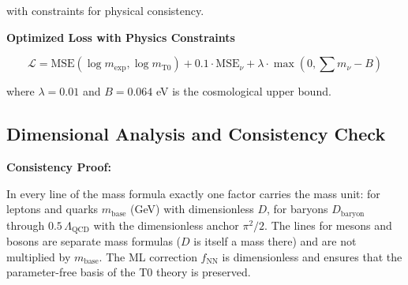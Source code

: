 	with constraints for physical consistency.
	
	\textbf{Optimized Loss with Physics Constraints}
	
	\begin{equation}
		\mathcal{L} = \text{MSE}(\log m_{\exp}, \log m_{\text{T0}}) + 0.1 \cdot \text{MSE}_{\nu} + \lambda \cdot \max(0, \sum m_{\nu} - B)
	\end{equation}
	
	where $\lambda = 0.01$ and $B = 0.064$ eV is the cosmological upper bound.
	
	\subsection{Dimensional Analysis and Consistency Check}
	
	\begin{table}[h]
		\centering
		\caption{Dimensional analysis of the extended T0 parameters}
		\label{tab:dimensions}
	\end{table}
	
	\textbf{Consistency Proof:}
	
	In every line of the mass formula exactly one factor carries the mass unit: for leptons and quarks $m_{\text{base}}$ (GeV) with dimensionless $D$, for baryons $D_{\text{baryon}}$ through $0.5\,\Lambda_{\text{QCD}}$ with the dimensionless anchor $\pi^2/2$. The lines for mesons and bosons are separate mass formulas ($D$ is itself a mass there) and are not multiplied by $m_{\text{base}}$. The ML correction $f_{\text{NN}}$ is dimensionless and ensures that the parameter-free basis of the T0 theory is preserved.
	
